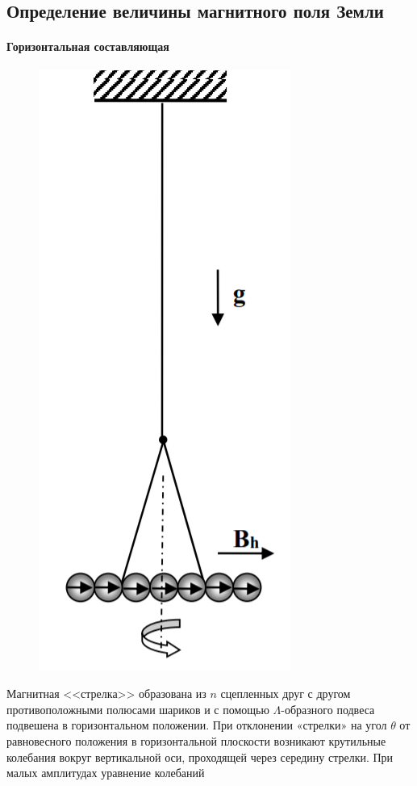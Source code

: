 \subsection*{Определение величины магнитного поля Земли}
\paragraph*{Горизонтальная составляющая}
\begin{figure}
\includegraphics[scale=0.5]{1.png}
\vspace{-60pt}
\end{figure}  
Магнитная <<стрелка>> образована из $n$ сцепленных друг с другом противоположными полюсами шариков и с помощью $\Lambda$-образного подвеса подвешена в горизонтальном положении. При отклонении «стрелки» на угол $\theta$ от равновесного положения в горизонтальной плоскости возникают крутильные колебания вокруг вертикальной оси, проходящей через середину стрелки. При малых амплитудах уравнение колебаний
